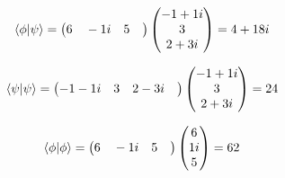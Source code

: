 \documentclass[10pt,a4paper]{article}
\begin{document}
\begin{align}
\braket{\phi|\psi}= \begin{pmatrix}
6\quad-1i\quad5\quad\end{pmatrix}\begin{pmatrix}
-1+1i\\
3\\
2+3i\\
\end{pmatrix}=4+18i &\end{align}

\begin{align}
\braket{\psi|\psi}= \begin{pmatrix}
-1-1i\quad3\quad2-3i\quad\end{pmatrix}\begin{pmatrix}
-1+1i\\
3\\
2+3i\\
\end{pmatrix}=24 &\end{align}

\begin{align}
\braket{\phi|\phi}= \begin{pmatrix}
6\quad-1i\quad5\quad\end{pmatrix}\begin{pmatrix}
6\\
1i\\
5\\
\end{pmatrix}=62 &\end{align}
\end{document}

